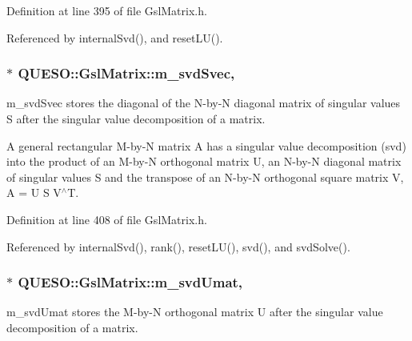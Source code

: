Definition at line 395 of file Gsl\-Matrix.\-h.



Referenced by internal\-Svd(), and reset\-L\-U().

\hypertarget{class_q_u_e_s_o_1_1_gsl_matrix_a9c2d46159d01da442aba68fbeecb2dfc}{
\subsubsection[{m\-\_\-svd\-Svec}]{$\ast$ Q\-U\-E\-S\-O\-::\-Gsl\-Matrix\-::m\-\_\-svd\-Svec\hspace{0.3cm}{\ttfamily [mutable]}, {\ttfamily [private]}}}\label{class_q_u_e_s_o_1_1_gsl_matrix_a9c2d46159d01da442aba68fbeecb2dfc}


m\-\_\-svd\-Svec stores the diagonal of the N-\/by-\/\-N diagonal matrix of singular values S after the singular value decomposition of a matrix. 

A general rectangular M-\/by-\/\-N matrix A has a singular value decomposition (svd) into the product of an M-\/by-\/\-N orthogonal matrix U, an N-\/by-\/\-N diagonal matrix of singular values S and the transpose of an N-\/by-\/\-N orthogonal square matrix V, A = U S V$^\wedge$\-T. 

Definition at line 408 of file Gsl\-Matrix.\-h.



Referenced by internal\-Svd(), rank(), reset\-L\-U(), svd(), and svd\-Solve().

\hypertarget{class_q_u_e_s_o_1_1_gsl_matrix_a764128029cce1c35d7371c6a7faf4161}{
\subsubsection[{m\-\_\-svd\-Umat}]{$\ast$ Q\-U\-E\-S\-O\-::\-Gsl\-Matrix\-::m\-\_\-svd\-Umat\hspace{0.3cm}{\ttfamily [mutable]}, {\ttfamily [private]}}}\label{class_q_u_e_s_o_1_1_gsl_matrix_a764128029cce1c35d7371c6a7faf4161}


m\-\_\-svd\-Umat stores the M-\/by-\/\-N orthogonal matrix U after the singular value decomposition of a matrix. 

